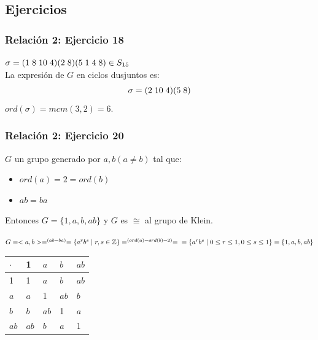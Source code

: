 \documentclass[11pt,a4paper]{article}
\begin{document}
\subsection{Ejercicios}

\subsubsection*{Relación 2: Ejercicio 18}

$\sigma = (1 \hspace{0.1cm} 8 \hspace{0.1cm} 10 \hspace{0.1cm} 4) (2 \hspace{0.1cm} 8) (5 \hspace{0.1cm} 1 \hspace{0.1cm} 4 \hspace{0.1cm} 8) \in S_{15}$ \\
La expresión de $G$ en ciclos dusjuntos es:
$$\sigma = (2 \hspace{0.1cm} 10 \hspace{0.1cm} 4) (5 \hspace{0.1cm} 8)$$
$ord(\sigma) = mcm(3,2) = 6$.

\subsubsection*{Relación 2: Ejercicio 20}

$G$ un grupo generado por $a, b (a\neq b)$ tal que:
\begin{itemize}
\item $ord(a) = 2 = ord(b)$
\item $ab = ba$
\end{itemize}
Entonces $G = \{1, a, b, ab\}$ y $G$ es $\cong$ al grupo de Klein.

$G = <a, b> =^{(ab=ba)} = \{a^{r}b^{s} \mid r,s \in \mathbb{Z}\} =^{(ord(a) = ord(b) = 2)}= \\ = \{a^{r}b^{s} \mid 0 \leq r \leq 1, 0 \leq s \leq 1\} = \{1, a, b, ab\}$

\begin{table}[ht]
\begin{tabular}{l|llll}
$\cdot$	& 1		& $a$	& $b$	& $ab$ \\ \hline
1 				& 1		& $a$	& $b$	& $ab$ \\
$a$ 			& $a$	& 1		& $ab$	& $b$ \\
$b$			& $b$	& $ab$	& 1		& $a$ \\
$ab$			& $ab$	& $b$	& $a$	& 1
\end{tabular}
\end{table}
\end{document}
